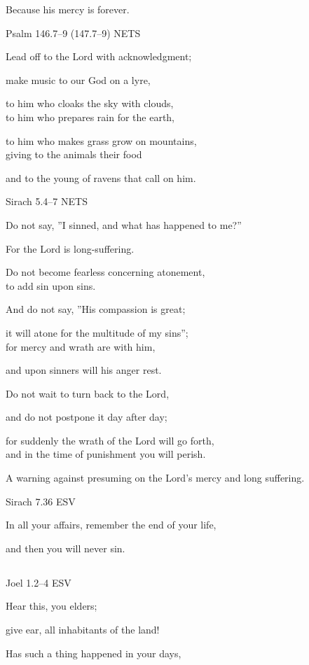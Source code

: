 \documentclass[
]{article}
\newcommand{\RL}[1]{\beginR #1\endR}
\begin{document}
Because his mercy is forever.

Psalm 146.7--9 (147.7--9) NETS

Lead off to the Lord with acknowledgment;

make music to our God on a lyre,

to him who cloaks the sky with clouds,\\
to him who prepares rain for the earth,

to him who makes grass grow on mountains,\\
giving to the animals their food

and to the young of ravens that call on him.

Sirach 5.4--7 NETS

Do not say, \RL{''}I sinned, and what has happened to me?''

For the Lord is long-suffering.

Do not become fearless concerning atonement,\\
to add sin upon sins.

And do not say, \RL{''}His compassion is great;

it will atone for the multitude of my sins'';\\
for mercy and wrath are with him,

and upon sinners will his anger rest.

Do not wait to turn back to the Lord,

and do not postpone it day after day;

for suddenly the wrath of the Lord will go forth,\\
and in the time of punishment you will perish.

A warning against presuming on the Lord's mercy and long suffering.

Sirach 7.36 ESV

In all your affairs, remember the end of your life,

and then you will never sin.

\subsection{}\label{section-1}

Joel 1.2--4 ESV

Hear this, you elders;

give ear, all inhabitants of the land!

Has such a thing happened in your days,
\end{document}
